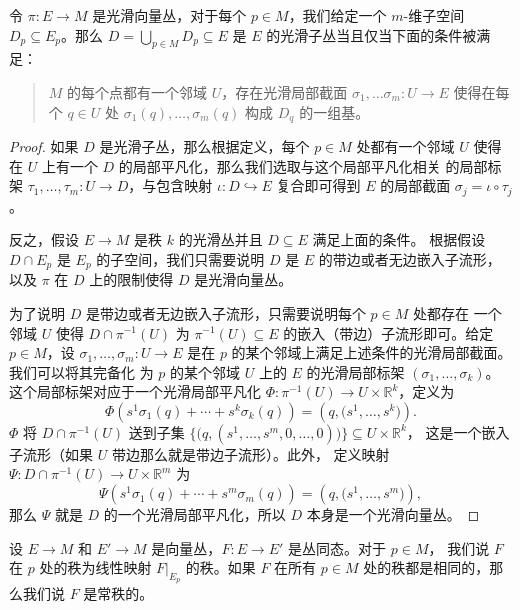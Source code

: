 \begin{lemma}[子丛的局部标架判别法]
  令 $\pi:E\to M$ 是光滑向量丛，对于每个 $p\in M$，我们给定一个
  $m$-维子空间 $D_p\subseteq E_p$。那么 $D=\bigcup_{p\in M}D_p\subseteq E$
  是 $E$ 的光滑子丛当且仅当下面的条件被满足：
  \begin{quote}
    $M$ 的每个点都有一个邻域 $U$，存在光滑局部截面 $\sigma_1,\dots\sigma_m:U\to E$
    使得在每个 $q\in U$ 处 $\sigma_1(q),\dots,\sigma_m(q)$ 构成 $D_q$ 的一组基。
  \end{quote}
\end{lemma}
\begin{proof}
  如果 $D$ 是光滑子丛，那么根据定义，每个 $p\in M$ 处都有一个邻域 $U$
  使得在 $U$ 上有一个 $D$ 的局部平凡化，那么我们选取与这个局部平凡化相关
  的局部标架 $\tau_1,\dots,\tau_m:U\to D$，与包含映射 $\iota:D\hookrightarrow E$
  复合即可得到 $E$ 的局部截面 $\sigma_j=\iota\circ\tau_j$。

  反之，假设 $E\to M$ 是秩 $k$ 的光滑丛并且 $D\subseteq E$ 满足上面的条件。
  根据假设 $D\cap E_p$ 是 $E_p$ 的子空间，我们只需要说明 $D$ 是 $E$
  的带边或者无边嵌入子流形，以及 $\pi$ 在 $D$ 上的限制使得 $D$ 是光滑向量丛。

  为了说明 $D$ 是带边或者无边嵌入子流形，只需要说明每个 $p\in M$ 处都存在
  一个邻域 $U$ 使得 $D\cap \pi^{-1}(U)$ 为 $\pi^{-1}(U)\subseteq E$
  的嵌入（带边）子流形即可。给定 $p\in M$，设 $\sigma_1,\dots,\sigma_m:U\to E$
  是在 $p$ 的某个邻域上满足上述条件的光滑局部截面。我们可以将其完备化
  为 $p$ 的某个邻域 $U$ 上的 $E$ 的光滑局部标架 $(\sigma_1,\dots,\sigma_k)$。
  这个局部标架对应于一个光滑局部平凡化 $\varPhi:\pi^{-1}(U)\to U\times \mathbb{R}^k$，定义为
  \[
    \varPhi\left(s^1\sigma_1(q)+\cdots+s^k\sigma_k(q)\right)=
    \left(q,\bigl(s^1,\dots,s^k\bigr)\right).
  \]
  $\varPhi$ 将 $D\cap\pi^{-1}(U)$ 送到子集 $\bigl\{\bigl(q,(s^1,\dots,s^m,0,\dots,0)\bigr)\bigr\}\subseteq U\times \mathbb{R}^k$，
  这是一个嵌入子流形（如果 $U$ 带边那么就是带边子流形）。此外，
  定义映射 $\Psi:D\cap\pi^{-1}(U)\to U\times \mathbb{R}^m$ 为
  \[
    \varPsi\left(s^1\sigma_1(q)+\cdots+s^m\sigma_m(q)\right)=
    \left(q,\bigl(s^1,\dots,s^m\bigr)\right),
  \]
  那么 $\varPsi$ 就是 $D$ 的一个光滑局部平凡化，所以 $D$ 本身是一个光滑向量丛。
\end{proof}

设 $E\to M$ 和 $E'\to M$ 是向量丛，$F:E\to E'$ 是丛同态。对于 $p\in M$，
我们说 $F$ 在 $p$ 处的秩为线性映射 $F|_{E_p}$ 的秩。如果 $F$
在所有 $p\in M$ 处的秩都是相同的，那么我们说 $F$ 是常秩的。

